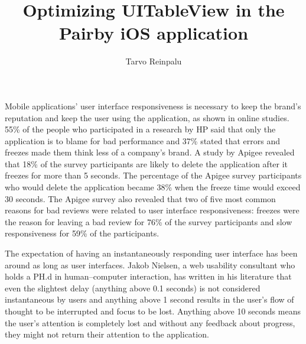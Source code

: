 \documentclass[a4paper,12pt]{article}
\begin{document}
\begin{itkTitlePage}
\title{Optimizing UITableView in the Pairby iOS application}
\author{Tarvo Reinpalu}
\end{itkTitlePage}




\itkMakeAuthorDeclaration

\clearpage
\thispagestyle{empty}
\setcounter{tocdepth}{2}
\tableofcontents




Mobile applications' user interface responsiveness is necessary to keep the brand's reputation and keep the user using the application, as shown in online studies.\cite{AppSpeedStudyHP}\cite{AppSpeedStudyApigee} 55\% of the people who participated in a research by HP said that only the application is to blame for bad performance and 37\% stated that errors and freezes made them think less of a company’s brand.\cite{AppSpeedStudyHP} A study by Apigee revealed that 18\% of the survey participants are likely to delete the application after it freezes for more than 5 seconds.\cite{AppSpeedStudyApigee} The percentage of the Apigee survey participants who would delete the application became 38\% when the freeze time would exceed 30 seconds.\cite{AppSpeedStudyApigee} The Apigee survey also revealed that two of five most common reasons for bad reviews were related to user interface responsiveness: freezes were the reason for leaving a bad review for 76\% of the survey participants and slow responsiveness for 59\% of the participants.\cite{AppSpeedStudyApigee}

The expectation of having an instantaneously responding user interface has been around as long as user interfaces.\cite{NielsenUsabilityEngineering} Jakob Nielsen, a web usability consultant who holds a PH.d in human–computer interaction\cite{JakobNielsenNNGroup}, has written in his literature that even the slightest delay (anything above 0.1 seconds) is not considered instantaneous by users and anything above 1 second results in the user's flow of thought to be interrupted and focus to be lost.\cite{NielsenUsabilityEngineering} Anything above 10 seconds means the user's attention is completely lost and without any feedback about progress, they might not return their attention to the application.\cite{NielsenUsabilityEngineering}
\end{document}
